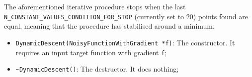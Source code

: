 \documentclass[11pt,a4paper,twoside]{article}
\begin{document}
The aforementioned iterative procedure stops when the last \verb+N_CONSTANT_VALUES_CONDITION_FOR_STOP+ (currently set to $20$) points found are equal, meaning that the procedure has stabilised around a minimum.

\begin{itemize}
   \item \verb+DynamicDescent(NoisyFunctionWithGradient *f)+: The constructor. It requires an input target function with gradient \verb+f+;
   \item \verb+~DynamicDescent()+: The destructor. It does nothing;
\end{itemize}




\printindex
\end{document}
